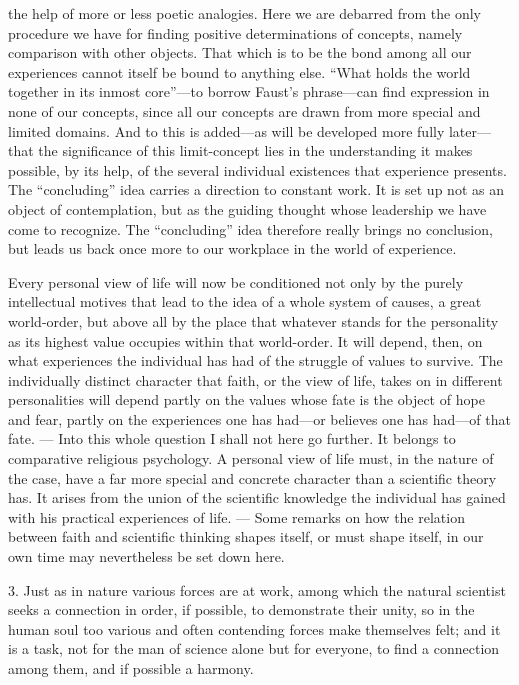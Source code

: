 \documentclass[12pt,a4paper]{article}
\newcommand{\opage}[1]{\marginnote{\footnotesize\textit{[#1]}}}
\begin{document}
the help of more or less poetic analogies. Here we are debarred from the only
procedure we have for finding positive determinations of concepts, namely comparison
with other objects. That which is to be the bond among all our experiences cannot
itself be bound to anything else. ``What holds the world together in its inmost
core''---to borrow Faust's phrase---can find expression in none of our concepts,
since all our concepts are drawn from more special and limited domains. And to this
is added---as will be developed more fully later---that the significance of this
limit-concept lies in the understanding it makes possible, by its help, of the
several individual existences that experience presents. The ``concluding'' idea
carries a direction to constant work. It is set up not as an \opage{35}object of contemplation,
but as the guiding thought whose leadership we have come to recognize. The
``concluding'' idea therefore really brings no conclusion, but leads us back once
more to our workplace in the world of experience.

Every personal view of life will now be conditioned not only by the purely
intellectual motives that lead to the idea of a whole system of causes, a great
world-order, but above all by the place that whatever stands for the personality as
its highest value occupies within that world-order. It will depend, then, on what
experiences the individual has had of the struggle of values to survive. The
individually distinct character that faith, or the view of life, takes on in
different personalities will depend partly on the values whose fate is the object of
hope and fear, partly on the experiences one has had---or believes one has had---of
that fate. --- Into this whole question I shall not here go further. It belongs to
comparative religious psychology. A personal view of life must, in the nature of the
case, have a far more special and concrete character than a scientific theory has. It
arises from the union of the scientific knowledge the individual has gained with his
practical experiences of life. --- Some remarks on how the relation between faith and
scientific thinking shapes itself, or must shape itself, in our own time may
nevertheless be set down here.

\medskip

3. Just as in nature various forces are at work, among which the natural scientist
seeks a connection in order, if possible, to demonstrate their unity, so in the
human soul too various and often contending forces make themselves felt; and it is a
task, not for the man of science alone but for everyone, to \opage{36}find a connection among
them, and if possible a harmony.
\end{document}
